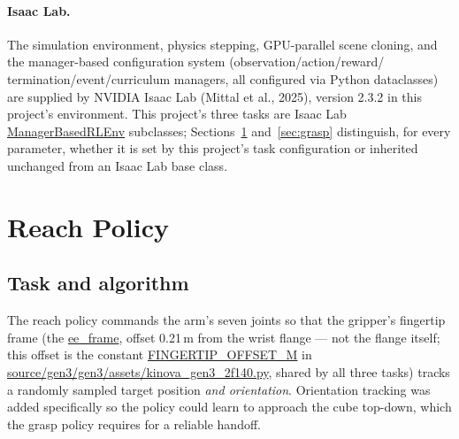 \documentclass[11pt]{article}
\begin{document}
\paragraph{Isaac Lab.} The simulation environment, physics stepping, GPU-parallel
scene cloning, and the manager-based configuration system (observation/action/reward/
termination/event/curriculum managers, all configured via Python dataclasses) are
supplied by NVIDIA Isaac Lab (Mittal et al., 2025), version 2.3.2 in this
project's environment. This project's three tasks are Isaac Lab
\url{ManagerBasedRLEnv} subclasses; Sections~\ref{sec:reach} and~\ref{sec:grasp}
distinguish, for every parameter, whether it is set by this project's task
configuration or inherited unchanged from an Isaac Lab base class.

\section{Reach Policy}
\label{sec:reach}

\subsection{Task and algorithm}

The reach policy commands the arm's seven joints so that the gripper's fingertip
frame (the \url{ee_frame}, offset 0.21\,m from the wrist flange --- not the
flange itself; this offset is the constant \url{FINGERTIP_OFFSET_M} in
\url{source/gen3/gen3/assets/kinova_gen3_2f140.py}, shared by all three tasks)
tracks a randomly sampled target position \emph{and orientation}.
Orientation tracking was added specifically so the policy could learn to approach
the cube top-down, which the grasp policy requires for a reliable handoff.
\end{document}
